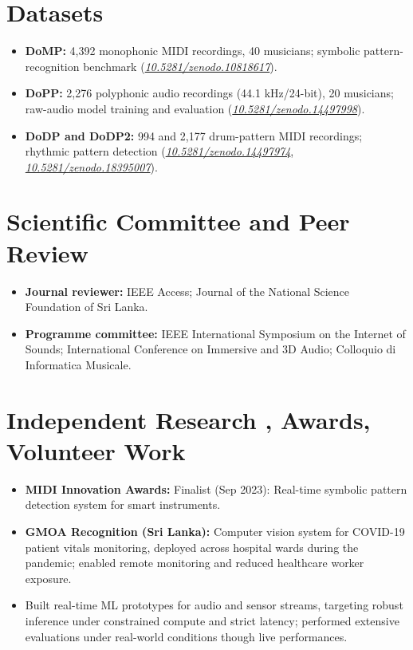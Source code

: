 \documentclass[11pt]{article}
\begin{document}
\section*{Datasets \footnotesize {}}
\begin{itemize}[leftmargin=1.2em, itemsep=-0.25em]
    \item \textbf{DoMP:} 4,392 monophonic MIDI recordings, 40 musicians; symbolic pattern-recognition benchmark (\href{https://doi.org/10.5281/zenodo.10818617}{\textit{10.5281/zenodo.10818617}}).
    \item \textbf{DoPP:} 2,276 polyphonic audio recordings (44.1 kHz/24-bit), 20 musicians; raw-audio model training and evaluation (\href{https://doi.org/10.5281/zenodo.14497998}{\textit{10.5281/zenodo.14497998}}).
    \item \textbf{DoDP and DoDP2:} 994 and 2,177 drum-pattern MIDI recordings; rhythmic pattern detection (\href{https://doi.org/10.5281/zenodo.14497974}{\textit{10.5281/zenodo.14497974}}, \href{https://doi.org/10.5281/zenodo.18395007}{\textit{10.5281/zenodo.18395007}}).
\end{itemize}

\section*{Scientific Committee and Peer Review}
\begin{itemize}[leftmargin=1.2em, itemsep=-0.25em]
    \item \textbf{Journal reviewer:} IEEE Access; Journal of the National Science Foundation of Sri Lanka.
    \item \textbf{Programme committee:} IEEE International Symposium on the Internet of Sounds; International Conference on Immersive and 3D Audio; Colloquio di Informatica Musicale.
\end{itemize}

\section*{Independent Research , Awards, Volunteer Work}
\begin{itemize}[leftmargin=1.2em, itemsep=-0.25em]
    \item \textbf{MIDI Innovation Awards:} Finalist (Sep 2023): Real-time symbolic pattern detection system for smart instruments.
    \item \textbf{GMOA Recognition (Sri Lanka):} Computer vision system for COVID-19 patient vitals monitoring, deployed across hospital wards during the pandemic; enabled remote monitoring and reduced healthcare worker exposure.
    \item Built real-time ML prototypes for audio and sensor streams, targeting robust inference under constrained compute and strict latency; performed extensive evaluations under real-world conditions though live performances.
\end{itemize}
\end{document}
